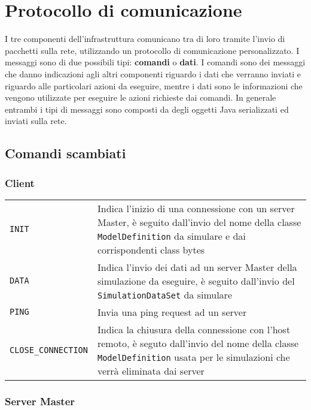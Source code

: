 
\section{Protocollo di comunicazione}

I tre componenti dell'infrastruttura comunicano tra di loro tramite l'invio di pacchetti sulla rete, utilizzando un protocollo di comunicazione personalizzato. 
I messaggi sono di due possibili tipi: \textbf{comandi} o \textbf{dati}. I comandi sono dei messaggi che danno indicazioni agli altri componenti riguardo i dati che verranno inviati e riguardo alle particolari azioni da eseguire, mentre i dati sono le informazioni che vengono utilizzate per eseguire le azioni richieste dai comandi. In generale entrambi i tipi di messaggi sono composti da degli oggetti Java serializzati ed inviati sulla rete.

\subsection{Comandi scambiati}

\subsubsection{Client}

\begin{table}[H]
    \begin{tabularx}{\linewidth}{ l X }
       \texttt{INIT}             & Indica l'inizio di una connessione con un server Master, è seguito dall'invio del nome della classe \texttt{ModelDefinition} da simulare e dai corrispondenti class bytes \\
       \texttt{DATA}             & Indica l'invio dei dati ad un server Master della simulazione da eseguire, è seguito dall'invio del \texttt{SimulationDataSet} da simulare \\
       \texttt{PING}             & Invia una ping request ad un server \\
       \texttt{CLOSE\_CONNECTION} & Indica la chiusura della connessione con l'host remoto, è seguto dall'invio del nome della classe \texttt{ModelDefinition} usata per le simulazioni che verrà eliminata dai server
    \end{tabularx}
\end{table}

\subsubsection{Server Master}

